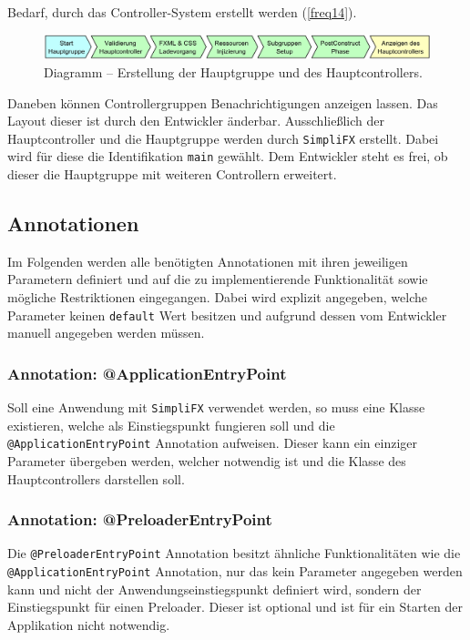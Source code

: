 Bedarf, durch das Controller-System erstellt werden (\autoref{freq14}).
\begin{figure}[H]
	\centering
	\includegraphics[width=\textwidth]{Abbildungen/Controller Erstellungsprozess.png}
	\caption{Diagramm -- Erstellung der Hauptgruppe und des Hauptcontrollers.}
	\label{fig:controller_init}
\end{figure}
\noindent Daneben können Controllergruppen Benachrichtigungen anzeigen lassen. Das Layout dieser ist durch den Entwickler änderbar. Ausschließlich der Hauptcontroller und die Hauptgruppe werden durch \texttt{SimpliFX} erstellt. Dabei wird für diese die Identifikation \texttt{main} gewählt. Dem Entwickler steht es frei, ob dieser die Hauptgruppe mit weiteren Controllern erweitert.
\subsection{Annotationen}
\label{annotations}
Im Folgenden werden alle benötigten Annotationen mit ihren jeweiligen Parametern definiert und auf die zu implementierende Funktionalität sowie mögliche Restriktionen eingegangen. Dabei wird explizit angegeben, welche Parameter keinen \texttt{default} Wert besitzen und aufgrund dessen vom Entwickler manuell angegeben werden müssen.
\subsubsection{Annotation: @ApplicationEntryPoint}
Soll eine Anwendung mit \texttt{SimpliFX} verwendet werden, so muss eine Klasse existieren, welche als Einstiegspunkt fungieren soll und die \texttt{@ApplicationEntryPoint} Annotation aufweisen. Dieser kann ein einziger Parameter übergeben werden, welcher notwendig ist und die Klasse des Hauptcontrollers darstellen soll.
\subsubsection{Annotation: @PreloaderEntryPoint}
Die \texttt{@PreloaderEntryPoint} Annotation besitzt ähnliche Funktionalitäten wie die \texttt{@ApplicationEntryPoint} Annotation, nur das kein Parameter angegeben werden kann und nicht der Anwendungseinstiegspunkt definiert wird, sondern der Einstiegspunkt für einen Preloader. Dieser ist optional und ist für ein Starten der Applikation nicht notwendig.
